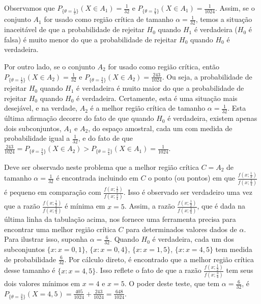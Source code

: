 \documentclass[12pt]{beamer}
\begin{document}
\begin{frame}{}
\begin{block}{}
\justifying
Observamos que \(P_{\{\theta=\frac{1}{2}\}}(X \in A_1) = \frac{1}{32}\) e \(P_{\{\theta=\frac{3}{4}\}}(X \in A_1) = \frac{1}{1024}\). Assim, se o conjunto \(A_1\) for usado como região crítica de tamanho \(\alpha = \frac{1}{32}\), temos a situação inaceitável de que a probabilidade de rejeitar \(H_0\) quando \(H_1\) é verdadeira (\(H_0\) é falsa) é muito menor do que a probabilidade de rejeitar \(H_0\) quando \(H_0\) é verdadeira.
\end{block}
\end{frame}

\begin{frame}{}
\begin{block}{}
\justifying
Por outro lado, se o conjunto \(A_2\) for usado como região crítica, então \(P_{\{\theta=\frac{1}{2}\}}(X \in A_2) = \frac{1}{32}\) e \(P_{\{\theta=\frac{3}{4}\}}(X \in A_2) = \frac{243}{1024}\). Ou seja, a probabilidade de rejeitar \(H_0\) quando \(H_1\) é verdadeira é muito maior do que a probabilidade de rejeitar \(H_0\) quando \(H_0\) é verdadeira. Certamente, esta é uma situação mais desejável, e na verdade, \(A_2\) é a melhor região crítica de tamanho \(\alpha = \frac{1}{32}\). Esta última afirmação decorre do fato de que quando \(H_0\) é verdadeira, existem apenas dois subconjuntos, \(A_1\) e \(A_2\), do espaço amostral, cada um com medida de probabilidade igual a \(\frac{1}{32}\), e do fato de que \(\frac{243}{1024} = P_{\{\theta=\frac{3}{4}\}}(X \in A_2) > P_{\{\theta=\frac{3}{4}\}}(X \in A_1) = \frac{1}{1024}\).
\end{block}
\end{frame}

\begin{frame}{}
\begin{block}{}
\justifying
Deve ser observado neste problema que a melhor região crítica \(C = A_2\) de tamanho \(\alpha = \frac{1}{32}\) é encontrada incluindo em \(C\) o ponto (ou pontos) em que \(\frac{f(x;\frac{1}{2})}{f(x;\frac{3}{4})}\) é pequeno em comparação com \(\frac{f(x;\frac{1}{2})}{f(x;\frac{3}{4})}\). Isso é observado ser verdadeiro uma vez que a razão \(\frac{f(x;\frac{1}{2})}{f(x;\frac{3}{4})}\) é mínima em \(x = 5\). Assim, a razão \(\frac{f(x;\frac{1}{2})}{f(x;\frac{3}{4})}\), que é dada na última linha da tabulação acima, nos fornece uma ferramenta precisa para encontrar uma melhor região crítica \(C\) para determinados valores dados de \(\alpha\). Para ilustrar isso, suponha \(\alpha = \frac{6}{32}\). Quando \(H_0\) é verdadeira, cada um dos subconjuntos \(\{x : x = 0, 1\}\), \(\{x : x = 0, 4\}\), \(\{x : x = 1, 5\}\), \(\{x : x = 4, 5\}\) tem medida de probabilidade \(\frac{6}{32}\). Por cálculo direto, é encontrado que a melhor região crítica desse tamanho é \(\{x : x = 4, 5\}\). Isso reflete o fato de que a razão \(\frac{f(x;\frac{1}{2})}{f(x;\frac{3}{4})}\) tem seus dois valores mínimos em \(x = 4\) e \(x = 5\). O poder deste teste, que tem \(\alpha = \frac{6}{32}\), é \(P_{\{\theta=\frac{3}{4}\}}(X = 4, 5) = \frac{405}{1024} + \frac{243}{1024} = \frac{648}{1024}\).
\end{block}
\end{frame}
\end{document}
